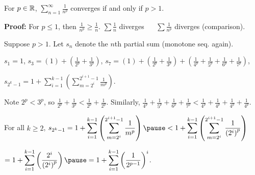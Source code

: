 \documentclass[10pt,aspectratio=149]{beamer}
\begin{document}
\begin{frame}

\begin{proposition}
For $p \in {\mathbb{R}}$, 
\quad
$\displaystyle
\sum_{n=1}^\infty \frac{1}{n^p}$
\quad
converges if and only if $p > 1$.
\end{proposition}

\pause
\textbf{Proof:}
For $p \leq 1$, then
$\frac{1}{n^p} \geq \frac{1}{n}$. \quad
$\sum \frac{1}{n}$ diverges ~\thus~
$\sum \frac{1}{n^p}$ diverges (comparison).

\pause
\medskip

Suppose $p > 1$.  Let $s_n$ denote the $n$th partial sum (monotone seq.
again).

\pause
\medskip

$s_1 = 1$,
\pause
\quad
$s_3 = \left( 1 \right) + \left( \frac{1}{2^p} + \frac{1}{3^p} \right)$,
\pause
\quad
$s_7 = \left( 1 \right) + \left( \frac{1}{2^p} + \frac{1}{3^p} \right) +
        \left( \frac{1}{4^p} + \frac{1}{5^p} + \frac{1}{6^p} + \frac{1}{7^p}
\right)$,

\pause
$\displaystyle
 s_{2^k - 1} = 
1 + 
\sum_{i=1}^{k-1}
\left(
\sum_{m=2^i}^{2^{i+1}-1} \frac{1}{m^p}
\right)$.

\pause
\medskip

Note $2^p < 3^p$, so
$\frac{1}{2^p} + \frac{1}{3^p} <
\frac{1}{2^p} + \frac{1}{2^p}$.
\pause
Similarly,
$\frac{1}{4^p} + \frac{1}{5^p} +
\frac{1}{6^p} + \frac{1}{7^p} <
\frac{1}{4^p} + \frac{1}{4^p} +
\frac{1}{4^p} + \frac{1}{4^p}$.

\pause
\medskip

For all $k \geq 2$, \quad
$\displaystyle
s_{2^k-1}
=
1+
\sum_{i=1}^{k-1}
\left(
\sum_{m=2^{i}}^{2^{i+1}-1} \frac{1}{m^p}
\right) 
\pause
<
1+
\sum_{i=1}^{k-1}
\left(
\sum_{m=2^{i}}^{2^{i+1}-1} \frac{1}{{(2^i)}^p}
\right) 
$

\pause
\medskip

\qquad\qquad\qquad\qquad\qquad\qquad
$\displaystyle
=
1+
\sum_{i=1}^{k-1}
\left(
\frac{2^i}{{(2^i)}^p}
\right) 
\pause
=
1+
\sum_{i=1}^{k-1}
{\left(
\frac{1}{2^{p-1}}
\right)}^i$.

\end{frame}
\end{document}
